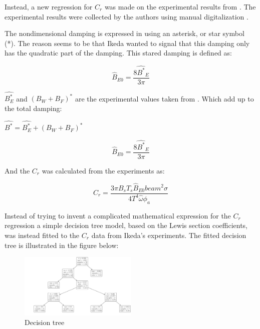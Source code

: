 Instead, a new regression for $C_r$ was made on the experimental
results from \citep{7505983/4AFVVGNT}. The experimental results were
collected by the authors using manual digitalization
\citep{7505983/RXYIE6UW}.

    The nondimensional damping is expressed in \citep{7505983/4AFVVGNT} using
an asterisk, or star symbol (*). The reason seems to be that Ikeda
wanted to signal that this damping only has the quadratic part of the
damping. This stared damping is defined as:
 
            
    
    \begin{equation}
\hat{B}_{E0} = \frac{8 \hat{B^*}_{E}}{3 \pi}
\label{eq:equation}
\end{equation}

    

    $\hat{B_E^*}$ and $(B_W+B_F)^*$ are the experimental values taken
from \citep{7505983/4AFVVGNT}. Which add up to the total damping:

    $\hat{B^*} = \hat{B^*_E} + (B_W+B_F)^*$
 
            
    
    \begin{equation}
\hat{B}_{E0} = \frac{8 \hat{B^*}_{E}}{3 \pi}
\label{eq:equation}
\end{equation}

    

    And the $C_r$ was calculated from the experiments as:
 
            
    
    \begin{equation}
C_{r} = \frac{3 \pi B_{s} T_{s} \hat{B}_{E0} beam^{2} \sigma}{4 T^{4} \hat{\omega} \phi_{a}}
\label{eq:equation}
\end{equation}

    

    Instead of trying to invent a complicated mathematical expression for
the $C_r$ regression a simple decision tree model, based on the Lewis
section coefficients, was instead fitted to the $C_r$ data from
Ikeda's experiments. The fitted decision tree is illustrated in the
figure below:

    \begin{figure}[H]
        \begin{center}\includegraphics[width = 0.5\textwidth]{figures/decision_tree.pdf}\end{center}
        \vspace{-1cm}
        \caption{Decision tree}
        \label{fig:decision_tree}
    \end{figure}
    
